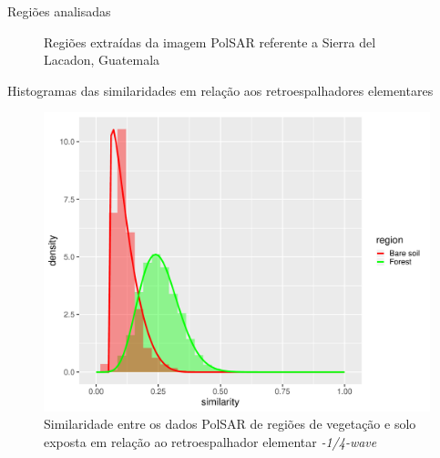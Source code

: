 \documentclass[10pt]{beamer}
\begin{document}
\begin{frame}{Regiões analisadas}
      \begin{figure}%
        \centering
        \qquad
        \caption{Regiões extraídas da imagem PolSAR referente a Sierra del Lacadon, Guatemala}%
        \label{fig:regions}%
    \end{figure}
\end{frame}

\begin{frame}{Histogramas das similaridades em relação aos retroespalhadores elementares}

\begin{figure}
    \centering
    \includegraphics[width = .6\linewidth]{wvn.pdf}
    \caption{Similaridade entre os dados PolSAR de regiões de vegetação e solo exposta em relação ao retroespalhador elementar \textit{-1/4-wave}}
    \label{fig:wvn}
\end{figure}
    
\end{frame}
\end{document}
